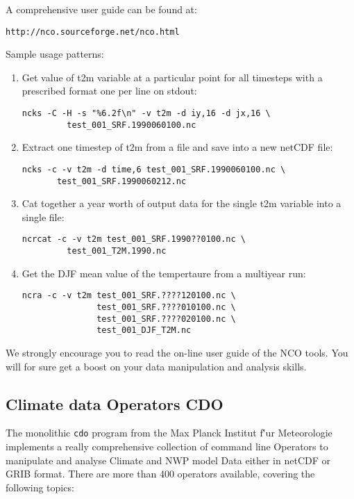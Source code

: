 A comprehensive user guide can be found at:

\begin{Verbatim}
http://nco.sourceforge.net/nco.html
\end{Verbatim}

Sample usage patterns:
\begin{enumerate}
\item Get value of t2m variable at a particular point for all timesteps with
a prescribed format one per line on stdout:
\begin{Verbatim}
ncks -C -H -s "%6.2f\n" -v t2m -d iy,16 -d jx,16 \
         test_001_SRF.1990060100.nc
\end{Verbatim}
\item Extract one timestep of t2m from a file and save into a new netCDF file:
\begin{Verbatim}
ncks -c -v t2m -d time,6 test_001_SRF.1990060100.nc \
       test_001_SRF.1990060212.nc
\end{Verbatim}
\item Cat together a year worth of output data for the single t2m variable
into a single file:
\begin{Verbatim}
ncrcat -c -v t2m test_001_SRF.1990??0100.nc \
         test_001_T2M.1990.nc
\end{Verbatim}
\item Get the DJF mean value of the tempertaure from a multiyear run:
\begin{Verbatim}
ncra -c -v t2m test_001_SRF.????120100.nc \
               test_001_SRF.????010100.nc \
               test_001_SRF.????020100.nc \
               test_001_DJF_T2M.nc
\end{Verbatim}
\end{enumerate}

We strongly encourage you to read the on-line user guide of the NCO tools.
You will for sure get a boost on your data manipulation and analysis skills.

\subsection{Climate data Operators CDO}

The monolithic \verb=cdo= program from the Max Planck Institut f\''ur
Meteorologie implements a really comprehensive collection of command line
Operators to manipulate and analyse Climate and NWP model Data either in netCDF
or GRIB format. There are more than 400 operators available, covering the
following topics:


